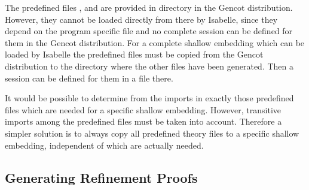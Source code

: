 The predefined files ,  and  are provided in 
directory  in the Gencot distribution. However, they cannot be loaded directly from there by Isabelle, 
since they depend on the program specific file  and no complete session can be defined for 
them in the Gencot distribution. For a complete shallow embedding which can be loaded by Isabelle the predefined
files must be copied from the Gencot distribution to the directory where the other files have been generated. Then 
a session can be defined for them in a  file there.

It would be possible to determine from the imports in  exactly those predefined
files which are needed for a specific shallow embedding. However, transitive imports among the predefined files
must be taken into account. Therefore a simpler solution is to always copy all predefined theory files to a 
specific shallow embedding, independent of which are actually needed.

\subsection{Generating Refinement Proofs}
\label{impl-isabelle-refine}

